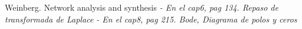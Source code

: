 \documentclass[informe.tex]{subfiles}
\begin{document}
Weinberg. Network analysis and synthesis\newline
\tab[1cm]\textit{- En el cap6, pag 134. Repaso de transformada de Laplace}\newline
\tab[1cm]\textit{- En el cap8, pag 215. Bode, Diagrama de polos y ceros}\newline
\end{document}
